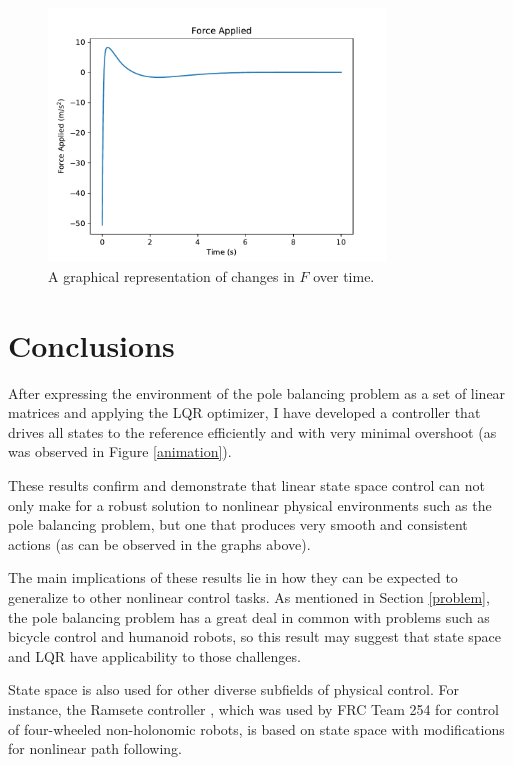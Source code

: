 \documentclass[11pt]{article}
\begin{document}
\begin{figure}[H]
    \centering
    \includegraphics[width=0.8\textwidth]{force}
    \caption{\label{force} A graphical representation of changes in $F$ over time.}
\end{figure}

\section{Conclusions}

After expressing the environment of the pole balancing problem as a set of linear matrices and applying the LQR optimizer, I have developed a controller that drives all states to the reference efficiently and with very minimal overshoot (as was observed in Figure \ref{animation}).

These results confirm and demonstrate that linear state space control can not only make for a robust solution to nonlinear physical environments such as the pole balancing problem, but one that produces very smooth and consistent actions (as can be observed in the graphs above).

The main implications of these results lie in how they can be expected to generalize to other nonlinear control tasks. As mentioned in Section \ref{problem}, the pole balancing problem has a great deal in common with problems such as bicycle control and humanoid robots, so this result may suggest that state space and LQR have applicability to those challenges.

State space is also used for other diverse subfields of physical control. For instance, the Ramsete controller \cite{ramsete}, which was used by FRC Team 254 for control of four-wheeled non-holonomic robots, is based on state space with modifications for nonlinear path following.
\end{document}
